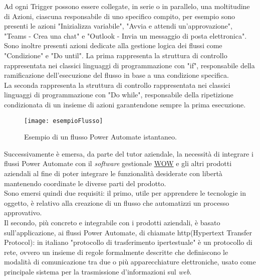 \noindent Ad ogni Trigger possono essere collegate, in serie o in parallelo, una moltitudine di Azioni, ciascuna responsabile di uno specifico compito, per esempio sono presenti le azioni "Inizializza variabile", "Avvia e attendi un'approvazione", "Teams - Crea una chat" e "Outlook - Invia un messaggio di posta elettronica".\\
Sono inoltre presenti azioni dedicate alla gestione logica dei flussi come "Condizione" e "Do until". La prima rappresenta la struttura di controllo rappresentata nei classici linguaggi di programmazione con "if", responsabile della ramificazione dell'esecuzione del flusso in base a una condizione specifica.\\
La seconda rappresenta la struttura di controllo rappresentata nei classici linguaggi di programmazione con "Do while", responsabile della ripetizione condizionata di un insieme di azioni garantendone sempre la prima esecuzione.
\begin{figure}[htbp] 
    \centering 
    \texttt{[image: esempioFlusso]} 
    \caption{Esempio di un flusso Power Automate istantaneo.}
    \label{fig:esempioFlusso}
\end{figure}
\newline \noindent Successivamente è emersa, da parte del tutor aziendale, la necessità di integrare i flussi Power Automate con il \emph{software} gestionale \hyperref[WOW]{WOW} e gli altri prodotti aziendali al fine di poter integrare le funzionalità desiderate con libertà mantenendo coordinate le diverse parti del prodotto.\\
Sono emersi quindi due requisiti: il primo, utile per apprendere le tecnologie in oggetto, è relativo alla creazione di un flusso che automatizzi un processo approvativo.\\
Il secondo, più concreto e integrabile con i prodotti aziendali, è basato sull'applicazione, ai flussi Power Automate, di chiamate \gls{http}(Hypertext Transfer Protocol): in italiano "protocollo di trasferimento ipertestuale" è un protocollo di rete, ovvero un insieme di regole formalmente descritte che definiscono le modalità di comunicazione tra due o più apparecchiature elettroniche, usato come principale sistema per la trasmissione d'informazioni sul \emph{web}.
